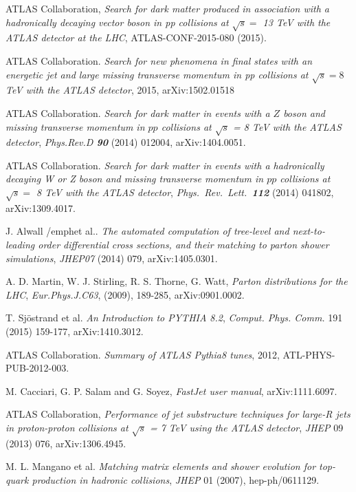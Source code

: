  ATLAS Collaboration, \emph{Search for dark matter produced in association with a hadronically decaying vector boson in pp collisions at $\sqrt{s}=$ 13 TeV with the ATLAS detector at the LHC}, ATLAS-CONF-2015-080 (2015).

 ATLAS Collaboration. \emph{Search for new phenomena in final states with an energetic jet and large missing transverse momentum in pp collisions at $\sqrt{s}=8$ TeV with the ATLAS detector}, 2015, arXiv:1502.01518

 ATLAS Collaboration. \emph{Search for dark matter in events with a $Z$ boson and missing transverse momentum in $pp$ collisions at $\sqrt{s}$ = 8 TeV with the ATLAS detector}, \emph{Phys.Rev.D \textbf{90}} (2014) 012004, arXiv:1404.0051.

 ATLAS Collaboration. \emph{Search for dark matter in events with a hadronically decaying W or Z boson and missing transverse momentum in $pp$ collisions at $\sqrt{s} =$ 8 TeV with the ATLAS detector}, \emph{Phys.\ Rev.\ Lett.\  {\bf 112}} (2014) 041802, arXiv:1309.4017.

 J. Alwall /emph{et al.}. \emph{The automated computation of tree-level and next-to-leading order differential cross sections, and their matching to parton shower simulations}, \emph{JHEP07} (2014) 079, arXiv:1405.0301.

 A. D. Martin, W. J. Stirling, R. S. Thorne, G. Watt, \emph{Parton distributions for the LHC}, \emph{Eur.Phys.J.C63}, (2009), 189-285, arXiv:0901.0002.

 T. Sjöstrand et al. \emph{An Introduction to PYTHIA 8.2}, \emph{Comput. Phys. Comm.} 191 (2015) 159-177, arXiv:1410.3012.

 ATLAS Collaboration. \emph{Summary of ATLAS Pythia8 tunes}, 2012, ATL-PHYS-PUB-2012-003.

 M. Cacciari, G. P. Salam and G. Soyez, \emph{FastJet user manual}, arXiv:1111.6097.

 ATLAS Collaboration, \emph{Performance of jet substructure techniques for large-R jets in proton-proton collisions at $\sqrt{s}$ = 7 TeV using the ATLAS detector}, \emph{JHEP} 09 (2013) 076, arXiv:1306.4945.

 M. L. Mangano et al. \emph{Matching matrix elements and shower evolution for top-quark production in hadronic collisions}, \emph{JHEP} 01 (2007), hep-ph/0611129.

